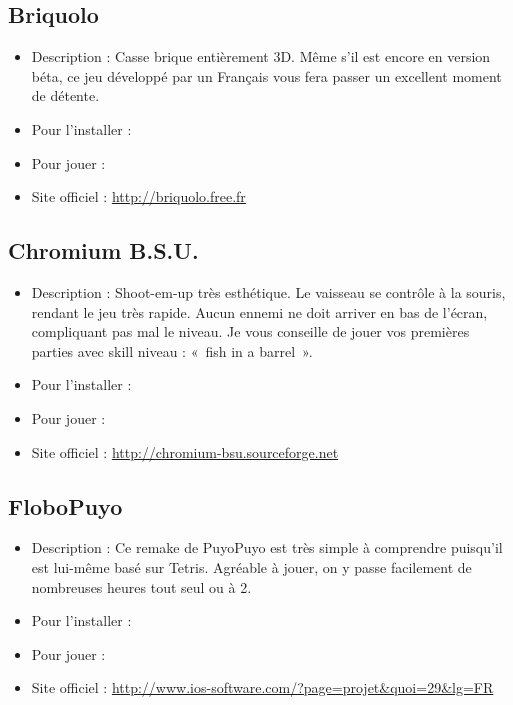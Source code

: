 \subsection{Briquolo}
\begin{itemize}
\begingroup
{}
\item Description : Casse brique entièrement 3D. Même s'il est encore en version béta, ce jeu développé par un Français vous fera passer un excellent moment de détente.{\par}
\item Pour l'installer : 
\item Pour jouer : 
\item Site officiel : \url{http://briquolo.free.fr}{\par}
\endgroup
\end{itemize}
\newpage
\subsection{Chromium B.S.U.}
\begin{itemize}
\begingroup
{}
\item Description : Shoot-em-up très esthétique. Le vaisseau se contrôle à la souris, rendant le jeu très rapide. Aucun ennemi ne doit arriver en bas de l'écran, compliquant pas mal le niveau. Je vous conseille de jouer vos premières parties avec skill niveau : «~fish in a barrel~». {\par}
\endgroup
\item Pour l'installer : 
\item Pour jouer : 
\item Site officiel : \url{http://chromium-bsu.sourceforge.net}{\par}
\end{itemize}
\subsection{FloboPuyo}
\begin{itemize}
\begingroup
{}
\item Description : Ce remake de PuyoPuyo est très simple à comprendre puisqu'il est lui-même basé sur Tetris. Agréable à jouer, on y passe facilement de nombreuses heures tout seul ou à 2.{\par}
\endgroup
\item Pour l'installer : 
\item Pour jouer : 
\item Site officiel : \url{http://www.ios-software.com/?page=projet&quoi=29&lg=FR}{\par}
\end{itemize}
